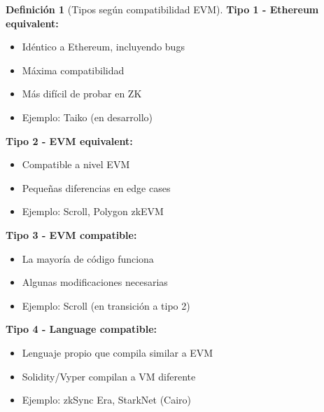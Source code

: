 \documentclass[11pt,a4paper,twoside,openright]{book}
\theoremstyle{definition}
\newtheorem{definition}{Definición}[chapter]
\theoremstyle{plain}
\theoremstyle{remark}
\begin{document}
\begin{definition}[Tipos según compatibilidad EVM]
\textbf{Tipo 1 - Ethereum equivalent:}
\begin{itemize}
    \item Idéntico a Ethereum, incluyendo bugs
    \item Máxima compatibilidad
    \item Más difícil de probar en ZK
    \item Ejemplo: Taiko (en desarrollo)
\end{itemize}

\textbf{Tipo 2 - EVM equivalent:}
\begin{itemize}
    \item Compatible a nivel EVM
    \item Pequeñas diferencias en edge cases
    \item Ejemplo: Scroll, Polygon zkEVM
\end{itemize}

\textbf{Tipo 3 - EVM compatible:}
\begin{itemize}
    \item La mayoría de código funciona
    \item Algunas modificaciones necesarias
    \item Ejemplo: Scroll (en transición a tipo 2)
\end{itemize}

\textbf{Tipo 4 - Language compatible:}
\begin{itemize}
    \item Lenguaje propio que compila similar a EVM
    \item Solidity/Vyper compilan a VM diferente
    \item Ejemplo: zkSync Era, StarkNet (Cairo)
\end{itemize}
\end{definition}

\begin{center}
\end{center}
\end{document}
